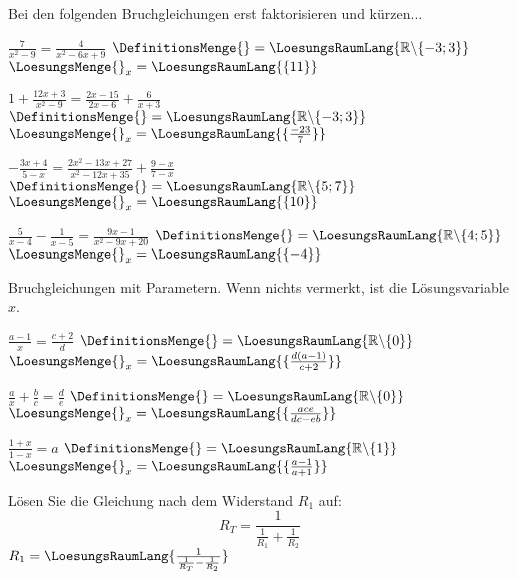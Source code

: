 \platzFuerBerechnungenBisEndeSeite{}

Bei den folgenden Bruchgleichungen erst faktorisieren und kürzen...

\begin{bbwAufgabenBlock}
\item $\frac7{x^2-9} = \frac4{x^2-6x+9}$ \hspace{10mm}    $\DefinitionsMenge{}= \LoesungsRaumLang{\mathbb{R}\backslash\{-3; 3\}}$ $\LoesungsMenge{}_x = \LoesungsRaumLang{\{11\}}$
\item $1 + \frac{12x+3}{x^2-9} = \frac{2x-15}{2x-6} + \frac{6}{x+3}$ \hspace{10mm}    $\DefinitionsMenge{}= \LoesungsRaumLang{\mathbb{R}\backslash\{-3; 3\}}$ $\LoesungsMenge{}_x = \LoesungsRaumLang{\{\frac{-23}{7}\}}$
\item $- \frac{3x+4}{5-x} = \frac{2x^2-13x+27}{x^2-12x+35} + \frac{9-x}{7-x}$ \hspace{10mm}    $\DefinitionsMenge{}= \LoesungsRaumLang{\mathbb{R}\backslash\{5;7\}}$ $\LoesungsMenge{}_x = \LoesungsRaumLang{\{10\}}$\noTRAINER{\newpage}
\item $\frac5{x-4} - \frac1{x-5} = \frac{9x-1}{x^2-9x+20}$ \hspace{10mm}    $\DefinitionsMenge{}= \LoesungsRaumLang{\mathbb{R}\backslash\{4;5\}}$ $\LoesungsMenge{}_x = \LoesungsRaumLang{\{-4\}}$
\end{bbwAufgabenBlock}



\platzFuerBerechnungenBisEndeSeite{}







Bruchgleichungen mit Parametern. Wenn nichts vermerkt, ist die
Lösungsvariable $x$.

\begin{bbwAufgabenBlock}
\item $\frac{a-1}x = \frac{c+2}d$ \hspace{10mm}    $\DefinitionsMenge{}= \LoesungsRaumLang{\mathbb{R}\backslash\{0\}}$ $\LoesungsMenge{}_x = \LoesungsRaumLang{\{\frac{d(a-1)}{c+2}\}}$
\item $\frac{a}x + \frac{b}c = \frac{d}e$ \hspace{10mm}    $\DefinitionsMenge{}= \LoesungsRaumLang{\mathbb{R}\backslash\{0\}}$ $\LoesungsMenge{}_x = \LoesungsRaumLang{\{\frac{ace}{dc-eb}\}}$
\item $\frac{1+x}{1-x} = a$ \hspace{10mm}    $\DefinitionsMenge{}= \LoesungsRaumLang{\mathbb{R}\backslash\{1\}}$ $\LoesungsMenge{}_x = \LoesungsRaumLang{\{\frac{a-1}{a+1}\}}$\noTRAINER{\newpage}
\item Lösen Sie die Gleichung nach dem Widerstand $R_1$ auf:
      $$R_T = \frac1{\frac1{R_1} + \frac1{R_2}}$$    $R_1 = \LoesungsRaumLang{\frac1{\frac1{R_T}-\frac1{R_2}}}$
\end{bbwAufgabenBlock}


